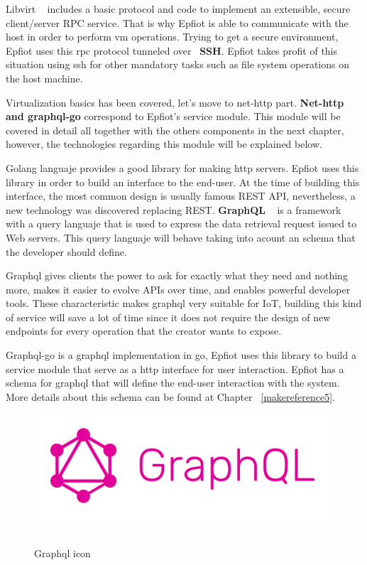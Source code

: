 \newpage

Libvirt ~\cite{libvirt_rpc} includes a basic protocol and code to implement an extensible, secure client/server RPC service. That is why Epfiot is able to communicate with the host in order to perform vm operations.
Trying to get a secure environment, Epfiot uses this rpc protocol tunneled over ~\textbf{SSH}. Epfiot takes profit of this situation using ssh for other mandatory tasks such as file system operations on the host machine.

Virtualization basics has been covered, let's move to net-http part.
\textbf{Net-http and graphql-go} correspond to Epfiot's service module. This module will be covered in detail all together with the others components in the next chapter, however, the technologies regarding this module will be explained below.

Golang languaje provides a good library for making http servers. Epfiot uses this library in order to build an interface to the end-user. At the time of building this interface, the most common design is usually famous REST API, nevertheless, a new technology was discovered replacing REST.
\textbf{GraphQL} ~\cite{graphqh_paper} is a framework with a query languaje that is used to express the data retrieval request issued to Web servers. This query languaje will behave taking into acount an schema that the developer should define.

Graphql gives clients the power to ask for exactly what they need and nothing more, makes it easier to evolve APIs over time, and enables powerful developer tools. These characteristic makes graphql very suitable for IoT, building this kind of service will save a lot of time since it does not require the design of new endpoints for every operation that the creator wants to expose.

Graphql-go is a graphql implementation in go, Epfiot uses this library to build a service module that serve as a http interface for user interaction. Epfiot has a schema for graphql that will define the end-user interaction with the system. More details about this schema can be found at Chapter ~\ref{makereference5}.

\begin{figure}[b!]%
\centering
    \includegraphics[width=4.5in]{figures/graphql.png}
~\caption{Graphql icon}
\label{figure3.5}
\end{figure}
\newpage

